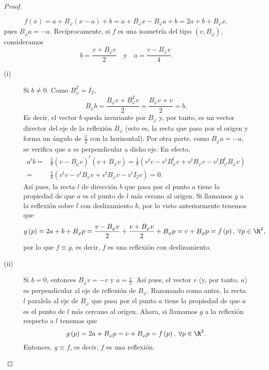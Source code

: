 \begin{proof}
\begin{description}
	\[f\left(x\right) = a + B_{\varphi}\left(x-a\right)+b = a + B_{\varphi}x-B_{\varphi}a+b = 2a + b + B_{\varphi}x ,\]
pues $\displaystyle B_{\varphi}a = - a $. Recíprocamente, si $\displaystyle f $ es una isometría del tipo $\displaystyle \left(v, B_{\varphi}\right) $, consideramos
\[b = \frac{v+B_{\varphi}v}{2} \quad \text{y} \quad a = \frac{v-B_{\varphi}v}{4} .\]
\begin{description}
\item[(i)] Si $\displaystyle b \neq 0 $. Como $\displaystyle B_{\varphi}^{2} = I_{2} $,
	\[B_{\varphi}b = \frac{B_{\varphi}v+B^{2}_{\varphi}v}{2} = \frac{B_{\varphi}v + v}{2} = b .\]
	Es decir, el vector $\displaystyle b $ queda invariante por $\displaystyle B_{\varphi} $ y, por tanto, es un vector director del eje de la reflexión $\displaystyle B_{\varphi} $ (esto es, la recta que pasa por el origen y forma un ángulo de $\displaystyle \frac{\varphi}{2} $ con la horizontal). Por otra parte, como $\displaystyle B_{\varphi}a = - a $, se verifica que $\displaystyle a $ es perpendicular a dicho eje. En efecto,
\[
\begin{split}
	a^{t}b = & \frac{1}{8}\left(v-B_{\varphi}v\right)^{t}\left(v+B_{\varphi}v\right) = \frac{1}{8}\left(v^{t}v - v^{t}B^{t}_{\varphi}v + v^{t}B_{\varphi}v-v^{t}B^{t}_{\varphi}B_{\varphi}v\right)\\ 
	= & \frac{1}{8}\left(v^{t}v - v^{t}B_{\varphi}v + v^{t}B_{\varphi}v-v^{t}I_{2}v\right) = 0.
\end{split}
\]
Así pues, la recta $\displaystyle l $ de dirección $\displaystyle b $  que pasa por el punto $\displaystyle a $ tiene la propiedad de que $\displaystyle a $ es el punto de $\displaystyle l $ más cerano al origen. Si llamamos $\displaystyle g $ a la reflexión sobre $\displaystyle l $ con deslizamiento $\displaystyle b $, por lo visto anteriormente tenemos que
\[g\left(p\right) = 2a + b + B_{\varphi}p = \frac{v-B_{\varphi}v}{2}+\frac{v+B_{\varphi}v}{2}+B_{\varphi}p = v + B_{\varphi}p = f\left(p\right), \; \forall p \in \R^{2},\]
por lo que $\displaystyle f \equiv g $, es decir, $\displaystyle f $ es una reflexión con deslizamiento.
\item[(ii)] Si $\displaystyle b = 0 $, entonces $\displaystyle B_{\varphi}v = - v $ y $\displaystyle a = \frac{v}{2} $. Así pues, el vector $\displaystyle v $ (y, por tanto, $\displaystyle a $) es perpendicular al eje de reflexión de $\displaystyle B_{\varphi} $. Razonando como antes, la recta $\displaystyle l $ paralela al eje de $\displaystyle B_{\varphi} $ que pasa por el punto $\displaystyle a $ tiene la propiedad de que $\displaystyle a $ es el punto de $\displaystyle l $ más cercano al origen. Ahora, si llamamos $\displaystyle g $ a la reflexión respecto a $\displaystyle l $ tenemos que
	\[g\left(p\right) = 2a + B_{\varphi}p = v + B_{\varphi}p = f\left(p\right), \; \forall p \in \R^{2} .\]
	Entonces, $\displaystyle g \equiv f $, es decir, $\displaystyle f $ es una reflexión.
\end{description}

\end{description}
\end{proof}

